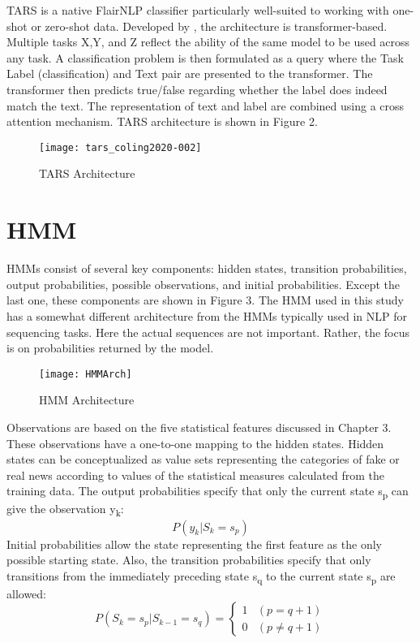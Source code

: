 \documentclass [11pt, proquest] {uwthesis}[2020/02/24]
\begin{document}
TARS is a native FlairNLP classifier particularly well-suited to working with one-shot or zero-shot data. Developed by \cite{Halder2020}, the architecture is transformer-based. Multiple tasks X,Y, and Z reflect the ability of the same model to be used across any task. A classification problem is then formulated as a query where the Task Label (classification) and Text pair are presented to the transformer. The transformer then predicts true/false regarding whether the label does indeed match the text. The representation of text and label are combined using a cross attention mechanism.  TARS architecture is shown in Figure 2. 
\begin{figure}[hbt!]
\begin{center}
\texttt{[image: tars\_coling2020-002]}
\end{center}
\caption{TARS Architecture \citep{Halder2020}}
\end{figure}


\pagebreak
\section{HMM}
HMMs consist of several key components: hidden states, transition probabilities, output probabilities, possible observations, and initial probabilities. Except the last one, these components are shown in Figure 3. The HMM used in this study has a somewhat different architecture from the HMMs typically used in NLP for sequencing tasks. Here the actual sequences are not important. Rather, the focus is on probabilities returned by the model.
\begin{figure}[hbt!]
\begin{center}
\texttt{[image: HMMArch]}
\end{center}
\caption{HMM Architecture}
\end{figure}

Observations are based on the five statistical features discussed in Chapter 3. These observations have a one-to-one mapping to the hidden states. Hidden states can be conceptualized as value sets representing the categories of fake or real news according to values of the statistical measures calculated from the training data. The output probabilities specify that only the current state s\textsubscript{p} can give the observation y\textsubscript{k}:
\begin{equation}
P(y_{k}|S_{k} = s_{p})
\end{equation}
Initial probabilities allow the state representing the first feature as the only possible starting state. Also, the transition probabilities specify that only transitions from the immediately preceding state s\textsubscript{q} to the current state s\textsubscript{p} are allowed:
\begin{equation}
P(S_{k} = s_{p}|S_{k-1} = s_{q}) = \begin{cases} 1 & (p=q+1) \\ 0 & (p \neq q+1) \end{cases}
\end{equation}
\end{document}
